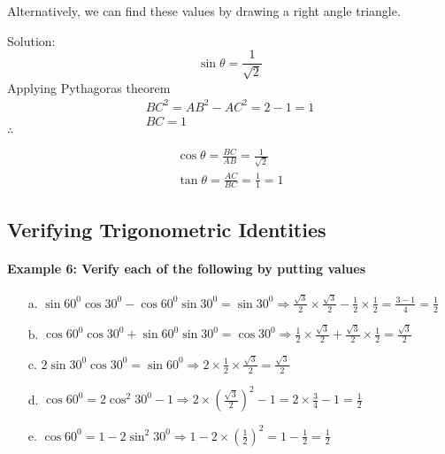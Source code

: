 \documentclass{article}
\begin{document}
Alternatively, we can find these values by drawing a right angle triangle.

\begin{center}
\end{center}

{\small Solution:}
\[ \sin\theta = \frac{1}{\sqrt{2}} \]
Applying Pythagoras theorem
\[
  \begin{aligned}
    BC^{2} = AB^{2} - AC^{2} = 2 - 1 = 1 \\
    BC = 1
  \end{aligned}
\]
$\therefore$

\[
  \begin{aligned}
    \cos\theta = \frac{BC}{AB} = \frac{1}{\sqrt{2}} \\
    \tan\theta = \frac{AC}{BC} = \frac{1}{1} = 1
  \end{aligned}
\]

\subsection{Verifying Trigonometric Identities}
\paragraph{Example 6: Verify each of the following by putting values}

\begin{enumerate}
  \item[a.] $\sin 60^{0} \cos 30^{0} - \cos 60^{0} \sin 30^{0} = \sin 30^{0} \Rightarrow \frac{\sqrt{3}}{2} \times \frac{\sqrt{3}}{2} - \frac{1}{2} \times \frac{1}{2} = \frac{3-1}{4}=\frac{1}{2}$
  \item[b.] $\cos 60^{0} \cos 30^{0} + \sin 60^{0} \sin 30^{0} = \cos 30^{0} \Rightarrow \frac{1}{2} \times \frac{\sqrt{3}}{2} + \frac{\sqrt{3}}{2} \times \frac{1}{2} = \frac{\sqrt{3}}{2}$
  \item[c.] $2 \sin 30^{0} \cos 30^{0} = \sin 60^{0} \Rightarrow 2 \times \frac{1}{2} \times \frac{\sqrt{3}}{2} = \frac{\sqrt{3}}{2}$
  \item[d.] $\cos 60^{0} = 2 \cos^{2} 30^{0} - 1 \Rightarrow 2 \times \left(\frac{\sqrt{3}}{2}\right)^{2} - 1 = 2 \times \frac{3}{4} - 1 = \frac{1}{2}$
  \item[e.] $\cos 60^{0} = 1 - 2 \sin^{2} 30^{0} \Rightarrow 1 - 2 \times \left(\frac{1}{2}\right)^{2} = 1 - \frac{1}{2} = \frac{1}{2}$
\end{enumerate}
\end{document}
